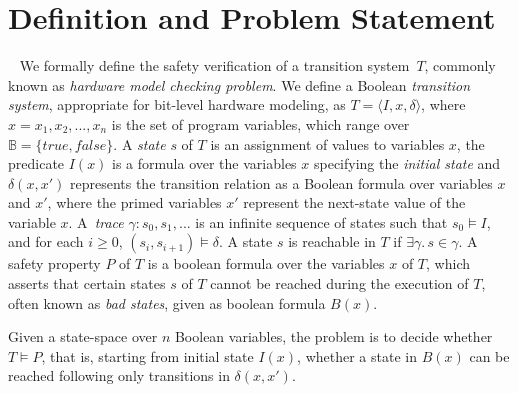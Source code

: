 \section{Definition and Problem Statement}~\label{problem}
%
We formally define the safety verification of a transition system~$T$,
commonly known as \emph{hardware model checking problem}.  We define a
Boolean \textit{transition system}, appropriate for bit-level hardware
modeling, as $T = \langle I,x,\delta \rangle$, where $x = x_1,x_2,...,x_n$
is the set of program variables, which range over $\mathbb{B} =
\{\mathit{true}, \mathit{false}\}$.  A \emph{state} $s$ of $T$ is an
assignment of values to variables $x$, the predicate $I(x)$ is a formula over
the variables $x$ specifying the \emph{initial state} and $\delta(x,x')$
represents the transition relation as a Boolean formula over variables $x$ and
$x'$, where the primed variables $x'$ represent the next-state value of the
variable $x$.  A~\emph{trace} $\gamma: s_0,s_1,...$ is an infinite sequence
of states such that $s_0 \models I$, and for each $i \geq 0$, $(s_i,s_{i+1})
\models \delta$.  A state $s$ is reachable in $T$ if $\exists \gamma.\, s
\in \gamma$.  A safety property $P$ of $T$ is a boolean formula over the
variables $x$ of $T$, which asserts that certain states $s$ of $T$ cannot be
reached during the execution of $T$, often known as \emph{bad states}, given
as boolean formula $B(x)$.

Given a state-space over $n$ Boolean variables, the problem is to
decide whether $T \models P$, that is, starting from initial state
$I(x)$, whether a state in $B(x)$ can be reached following only
transitions in $\delta(x,x')$.
%
